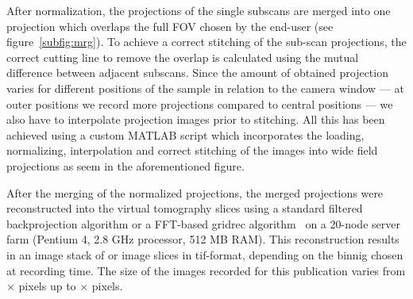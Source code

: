 After normalization, the projections of the single subscans are merged into one projection which overlaps the full FOV chosen by the end-user (see figure~\ref{subfig:mrg}). To achieve a correct stitching of the sub-scan projections, the correct cutting line to remove the overlap is calculated using the mutual difference between adjacent subscans. Since the amount of obtained projection varies for different positions of the sample in relation to the camera window --- at outer positions we record more projections compared to central positions --- we also have to interpolate projection images prior to stitching. All this has been achieved using a custom MATLAB\textsuperscript{\textregistered} script which incorporates the loading, normalizing, interpolation and correct stitching of the images into wide field projections as seem in the aforementioned figure.

After the merging of the normalized projections, the merged projections were reconstructed into the virtual tomography slices using a standard filtered backprojection algorithm or a FFT-based gridrec algorithm~\cite{Dowd2003} on a 20-node server farm (Pentium 4, 2.8 GHz processor, 512 MB RAM). This reconstruction results in an image stack of  or  image slices in tif-format, depending on the binnig chosen at recording time. The size of the images recorded for this publication varies from $\times$ pixels up to $\times$ pixels.